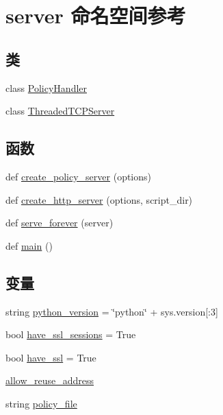 \hypertarget{namespaceserver}{}\section{server 命名空间参考}
\label{namespaceserver}
\subsection*{类}
\begin{DoxyCompactItemize}
\item 
class \mbox{\hyperlink{classserver_1_1_policy_handler}{Policy\+Handler}}
\item 
class \mbox{\hyperlink{classserver_1_1_threaded_t_c_p_server}{Threaded\+T\+C\+P\+Server}}
\end{DoxyCompactItemize}
\subsection*{函数}
\begin{DoxyCompactItemize}
\item 
def \mbox{\hyperlink{namespaceserver_a2789ab523ceef7e25828435e6c51529d}{create\+\_\+policy\+\_\+server}} (options)
\item 
def \mbox{\hyperlink{namespaceserver_aa600f791a9d38b43a5425a80925f7516}{create\+\_\+http\+\_\+server}} (options, script\+\_\+dir)
\item 
def \mbox{\hyperlink{namespaceserver_a1a282be6be1de080e6276cb7b4f19769}{serve\+\_\+forever}} (server)
\item 
def \mbox{\hyperlink{namespaceserver_a6d1c10ed8aa5d27e61ed9db6b4274261}{main}} ()
\end{DoxyCompactItemize}
\subsection*{变量}
\begin{DoxyCompactItemize}
\item 
string \mbox{\hyperlink{namespaceserver_a2d9eb5bc772371a5bf0eab11f69c96e0}{python\+\_\+version}} = \char`\"{}python\char`\"{} + sys.\+version\mbox{[}\+:3\mbox{]}
\item 
bool \mbox{\hyperlink{namespaceserver_a1a00a033df4f0f501c08a48b0fe3576e}{have\+\_\+ssl\+\_\+sessions}} = True
\item 
bool \mbox{\hyperlink{namespaceserver_ac00fdf40a0746b38ef2edcfbc30e8ab4}{have\+\_\+ssl}} = True
\item 
\mbox{\hyperlink{namespaceserver_a4370bca87712ae693b825e12c75eb8de}{allow\+\_\+reuse\+\_\+address}}
\item 
string \mbox{\hyperlink{namespaceserver_a6bc5d1b1f25bf1fde3266fa15447a414}{policy\+\_\+file}}
\end{DoxyCompactItemize}


